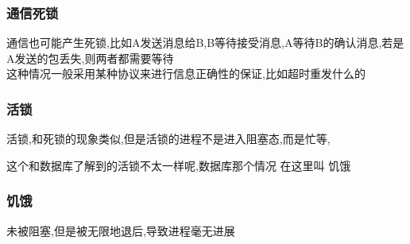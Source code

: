 \documentclass[UTF8,a4paper]{ctexart}
\begin{document}
  \subsubsection{通信死锁}
  通信也可能产生死锁,比如A发送消息给B,B等待接受消息,A等待B的确认消息,若是A发送的包丢失,则两者都需要等待\\
  这种情况一般采用某种协议来进行信息正确性的保证,比如超时重发什么的

  \subsubsection{活锁}
  活锁,和死锁的现象类似,但是活锁的进程不是进入阻塞态,而是忙等,

  {\color{red}这个和数据库了解到的活锁不太一样呢,数据库那个情况 在这里叫 饥饿}

  \subsubsection{饥饿}
  未被阻塞,但是被无限地退后,导致进程毫无进展
\end{document}
